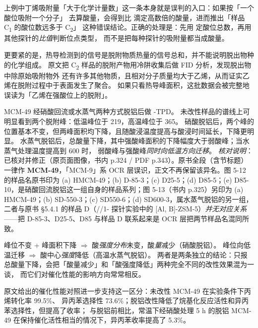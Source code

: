 \begin{pitfall}
上例中丁烯吸附量「大于化学计量数」这一条本身就是误判的入口：如果按「一个酸位吸附一个分子」
去算酸量，会得到比  滴定高数倍的酸量，进而推出「样品 C\textsubscript{1} 的酸位数远多于 C\textsubscript{2}」
这种错误结论。正确的处理是：先用  定酸位总数，再用其他探针的\emph{比值}判断位点类型，
而不是把每种探针的吸附量都当成酸量。

更要紧的是，热导检测到的信号是脱附物质热量的信号总和，并不能说明脱出物种的化学组成。
原文把 C\textsubscript{2} 样品的脱附产物用冷阱收集后做 FID 分析，发现脱出物中除原始吸附物外
还有许多其他物质，且相对分子质量均大于乙烯，从而证实乙烯在脱附过程中于表面发生了聚合。
如果只看热导峰面积，这批数据会被完整地误读为「乙烯在强酸位上的脱附」。
\end{pitfall}

\begin{example}[峰温迁移与峰面积变化的分离]
\begin{obs}
MCM-49 经硝酸回流或水蒸气两种方式脱铝后做 -TPD。
未改性样品的谱线上可明显看到两个脱附峰：低温峰位于 \qty{219}{\degC}，高温峰位于 \qty{365}{\degC}。
硝酸脱铝后，两个峰的位置基本不变，但两峰面积均下降，且随酸浸温度提高与酸浸时间延长，下降更明显。
水蒸气脱铝后，总酸量下降，其中强酸峰面积的下降幅度大于弱酸峰；当水蒸气处理温度提高到 \qty{600}{\degC} 时，
弱酸峰与强酸峰\emph{同时向低温方向迁移}。
\emph{核对说明}：已核对并修正（原页面图像，书内 p.324 / PDF p.343）。原书全段（含节标题）一律作 \textbf{MCM-49}，「MCM-9」系 OCR 层误识，正文不再保留该异名。图 5-12 的样品名原书印为 (a) HMCM-49；(b) D-85-3；(c) D25-5；(d) D85-5；(e) D85-10，是硝酸回流脱铝这一组自身的样品系列；图 5-13（书内 p.325）另印为 (a) HMCM-49；(b) SD-550-3；(c) SD550-6；(d) SD600-3，属水蒸气脱铝的另一组，二者与原书 \S5.4.1 的样品 D（//1- 探针实验中的 [Al, B]-ZSM-5）\emph{并无对应关系}——把 D-85-3、D25-5、D85 与样品 D 联系起来是 OCR 层把两节样品名混同所致。
\end{obs}
\begin{infer}
峰位不变 + 峰面积下降 $\Rightarrow$ 酸\emph{强度分布}未变，酸\emph{量}减少（硝酸脱铝）。
峰位向低温迁移 $\Rightarrow$ 酸中心\emph{强度}降低（高温水蒸气脱铝）。
两者是两条独立的结论：只报总酸量下降，会把「酸量减少」和「酸强度降低」两种完全不同的改性效果混为一谈，
而它们对催化性能的影响方向常常相反。
\end{infer}
\end{example}

原文给出的催化性能对照进一步支持这一区分：未改性 MCM-49 在实验条件下丙烯转化率 99.5\%、
异丙苯选择性 73.6\%；脱铝改性降低了烷基化反应活性和异丙苯选择性，但提高了收率；
与脱铝前相比，常温下经硝酸处理 5 h 的脱铝 MCM-49 在保持催化活性相当的情况下，异丙苯收率提高了 5.3\%。


